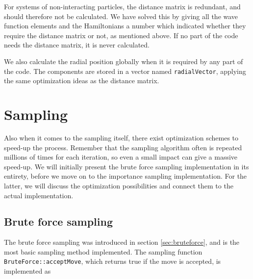 For systems of non-interacting particles, the distance matrix is redundant, and should therefore not be calculated. We have solved this by giving all the wave function elements and the Hamiltonians a number which indicated whether they require the distance matrix or not, as mentioned above. If no part of the code needs the distance matrix, it is never calculated. 

We also calculate the radial position globally when it is required by any part of the code. The components are stored in a vector named \lstinline{radialVector}, applying the same optimization ideas as the distance matrix. 

\section{Sampling} \label{sec:sampling}
Also when it comes to the sampling itself, there exist optimization schemes to speed-up the process. Remember that the sampling algorithm often is repeated millions of times for each iteration, so even a small impact can give a massive speed-up. We will initially present the brute force sampling implementation in its entirety, before we move on to the importance sampling implementation. For the latter, we will discuss the optimization possibilities and connect them to the actual implementation.

\subsection{Brute force sampling}
The brute force sampling was introduced in section \ref{sec:bruteforce}, and is the most basic sampling method implemented. The sampling function \lstinline{BruteForce::acceptMove}, which returns true if the move is accepted, is implemented as

